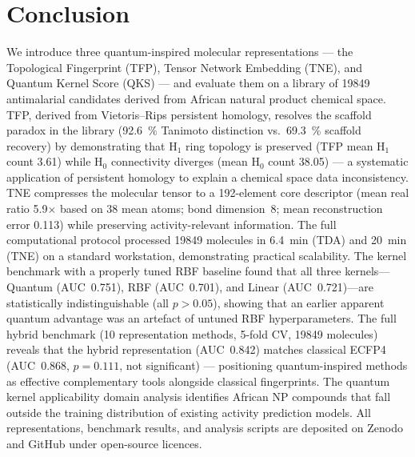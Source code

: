 \documentclass[11pt,a4paper]{article}
\begin{document}

\section{Conclusion}

We introduce three quantum-inspired molecular representations --- the Topological Fingerprint (TFP), Tensor Network Embedding (TNE), and Quantum Kernel Score (QKS) --- and evaluate them on a library of \num{19849} antimalarial candidates derived from African natural product chemical space. TFP, derived from Vietoris--Rips persistent homology, resolves the scaffold paradox in the library (\qty{92.6}{\percent} Tanimoto distinction vs.\ \qty{69.3}{\percent} scaffold recovery) by demonstrating that H$_1$ ring topology is preserved (TFP mean H$_1$ count 3.61) while H$_0$ connectivity diverges (mean H$_0$ count 38.05) --- a systematic application of persistent homology to explain a chemical space data inconsistency. TNE compresses the molecular tensor to a \num{192}-element core descriptor (mean real ratio \num{5.9}$\times$ based on \num{38} mean atoms; bond dimension~8; mean reconstruction error 0.113) while preserving activity-relevant information. The full computational protocol processed \num{19849} molecules in \SI{6.4}{\minute} (TDA) and \SI{20}{\minute} (TNE) on a standard workstation, demonstrating practical scalability. The kernel benchmark with a properly tuned RBF baseline found that all three kernels---Quantum (AUC~0.751), RBF (AUC~0.701), and Linear (AUC~0.721)---are statistically indistinguishable (all $p > \num{0.05}$), showing that an earlier apparent quantum advantage was an artefact of untuned RBF hyperparameters. The full hybrid benchmark (10 representation methods, \num{5}-fold CV, \num{19849} molecules) reveals that the hybrid representation (AUC~0.842) matches classical ECFP4 (AUC~0.868, $p = \num{0.111}$, not significant) --- positioning quantum-inspired methods as effective complementary tools alongside classical fingerprints. The quantum kernel applicability domain analysis identifies African NP compounds that fall outside the training distribution of existing activity prediction models. All representations, benchmark results, and analysis scripts are deposited on Zenodo and GitHub under open-source licences.

\end{document}
